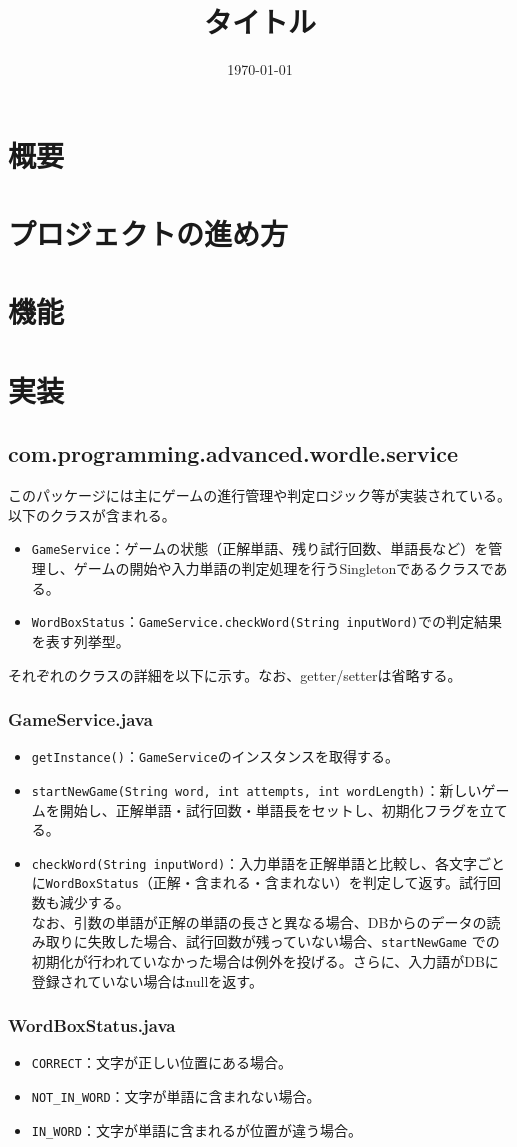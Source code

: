 \documentclass[a4j]{ujarticle}
\title{タイトル}
\date{\today}
\author{}
\begin{document}
\maketitle
\section{概要}
\section{プロジェクトの進め方}
\section{機能}
\section{実装}
\subsection{com.programming.advanced.wordle.service}
このパッケージには主にゲームの進行管理や判定ロジック等が実装されている。以下のクラスが含まれる。
\begin{itemize}
  \item \texttt{GameService}：ゲームの状態（正解単語、残り試行回数、単語長など）を管理し、ゲームの開始や入力単語の判定処理を行うSingletonであるクラスである。
  \item \texttt{WordBoxStatus}：\texttt{GameService.checkWord(String inputWord)}での判定結果を表す列挙型。
\end{itemize}

それぞれのクラスの詳細を以下に示す。なお、getter/setterは省略する。
\subsubsection{GameService.java}

\begin{itemize}
  \item \texttt{getInstance()}：\texttt{GameService}のインスタンスを取得する。
  \item \texttt{startNewGame(String word, int attempts, int wordLength)}：新しいゲームを開始し、正解単語・試行回数・単語長をセットし、初期化フラグを立てる。
  \item \texttt{checkWord(String inputWord)}：入力単語を正解単語と比較し、各文字ごとに\texttt{WordBoxStatus}（正解・含まれる・含まれない）を判定して返す。試行回数も減少する。\\
  なお、引数の単語が正解の単語の長さと異なる場合、DBからのデータの読み取りに失敗した場合、試行回数が残っていない場合、\texttt{startNewGame} での初期化が行われていなかった場合は例外を投げる。さらに、入力語がDBに登録されていない場合はnullを返す。
\end{itemize}

\subsubsection{WordBoxStatus.java}

\begin{itemize}
  \item \texttt{CORRECT}：文字が正しい位置にある場合。
  \item \texttt{NOT\_IN\_WORD}：文字が単語に含まれない場合。
  \item \texttt{IN\_WORD}：文字が単語に含まれるが位置が違う場合。
\end{itemize}
\end{document}

